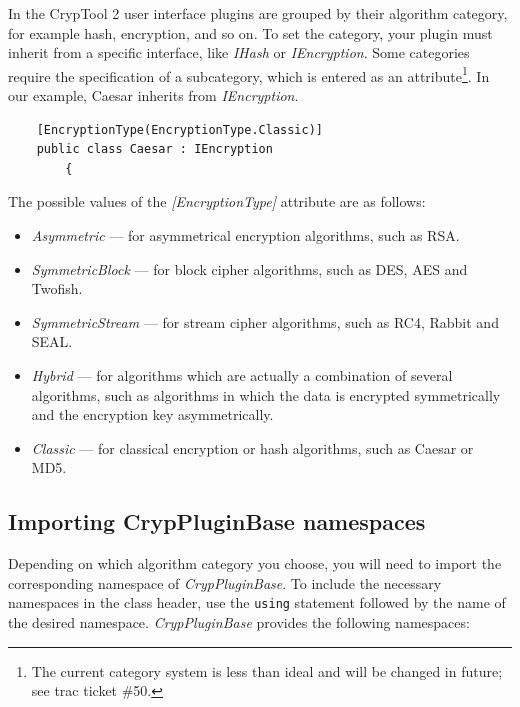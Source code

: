 In the CrypTool 2 user interface plugins are grouped by their algorithm category, for example hash, encryption, and so on. To set the category, your plugin must inherit from a specific interface, like \textit{IHash} or \textit{IEncryption}. Some categories require the specification of a subcategory, which is entered as an attribute\footnote{The current category system is less than ideal and will be changed in future; see trac ticket \#50.}. In our example, Caesar inherits from \textit{IEncryption}.

\begin{lstlisting}
    [EncryptionType(EncryptionType.Classic)]
    public class Caesar : IEncryption
		{
\end{lstlisting}
\clearpage

The possible values of the \textit{[EncryptionType]} attribute are as follows:

\begin{itemize}
	\item \textit{Asymmetric} --- for asymmetrical encryption algorithms, such as RSA.
	\item \textit{SymmetricBlock} --- for block cipher algorithms, such as DES, AES and Twofish.
	\item \textit{SymmetricStream} --- for stream cipher algorithms, such as RC4, Rabbit and SEAL.
	\item \textit{Hybrid} --- for algorithms which are actually a combination of several algorithms, such as algorithms in which the data is encrypted symmetrically and the encryption key asymmetrically.
	\item \textit{Classic} --- for classical encryption or hash algorithms, such as Caesar or MD5.
\end{itemize}

\subsection{Importing CrypPluginBase namespaces}
\label{sec:ImportingCrypPluginBaseNamespaces}

Depending on which algorithm category you choose, you will need to import the corresponding namespace of \textit{CrypPluginBase}. To include the necessary namespaces in the class header, use the \texttt{using} statement followed by the name of the desired namespace. \textit{CrypPluginBase} provides the following namespaces:

